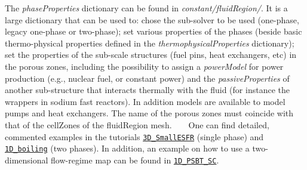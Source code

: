 The {\itshape phase\+Properties} dictionary can be found in {\itshape constant/fluid\+Region/}. It is a large dictionary that can be used to\+: chose the sub-\/solver to be used (one-\/phase, legacy one-\/phase or two-\/phase); set various properties of the phases (beside basic thermo-\/physical properties defined in the {\itshape thermophysical\+Properties} dictionary); set the properties of the sub-\/scale structures (fuel pins, heat exchangers, etc) in the porous zones, including the possibility to assign a {\itshape power\+Model} for power production (e.\+g., nuclear fuel, or constant power) and the {\itshape passive\+Properties} of another sub-\/structure that interacts thermally with the fluid (for instance the wrappers in sodium fast reactors). In addition models are available to model pumps and heat exchangers. The name of the porous zones must coincide with that of the cell\+Zones of the fluid\+Region mesh. ~\newline
 ~\newline
 One can find detailed, commented examples in the tutorials \href{https://gitlab.com/foam-for-nuclear/GeN-Foam/-/tree/master/Tutorials/3D_SmallESFR/rootCase/constant/fluidRegion/phaseProperties}{\tt 3\+D\+\_\+\+Small\+E\+S\+FR} (single phase) and \href{https://gitlab.com/foam-for-nuclear/GeN-Foam/-/tree/master/Tutorials/1D_boiling/constant/fluidRegion/phaseProperties}{\tt 1\+D\+\_\+boiling} (two phases). In addition, an example on how to use a two-\/dimensional flow-\/regime map can be found in \href{https://gitlab.com/foam-for-nuclear/GeN-Foam/-/tree/master/Tutorials/1D_PSBT_SC/constant/fluidRegion/phaseProperties}{\tt 1\+D\+\_\+\+P\+S\+B\+T\+\_\+\+SC}. ~\newline
 

